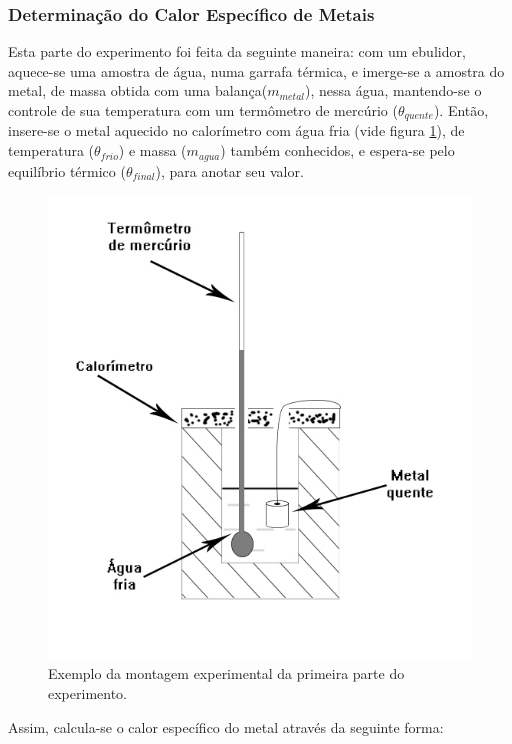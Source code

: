 \documentclass[12pt,a4paper]{article}
\begin{document}
\subsubsection{Determinação do Calor Específico de Metais}

Esta parte do experimento foi feita da seguinte maneira: com um ebulidor, aquece-se uma amostra de água, numa garrafa térmica, e imerge-se a amostra do metal, de massa obtida com uma balança($m_{metal}$), nessa água, mantendo-se o controle de sua temperatura com um termômetro de mercúrio ($\theta_{quente}$). Então, insere-se o metal aquecido no calorímetro com água fria (vide figura \ref{CalorMetais}), de temperatura ($\theta_{frio}$) e massa ($m_{agua}$) também conhecidos, e espera-se pelo equilíbrio térmico ($\theta_{final}$), para anotar seu valor.

\begin{figure}[!htbp]
\centering
\includegraphics[scale=0.45]{Fig6b1.jpg}
\caption{Exemplo da montagem experimental da primeira parte do experimento.}
\label{CalorMetais}
\end{figure}

Assim, calcula-se o calor específico do metal através da seguinte forma:
\end{document}
